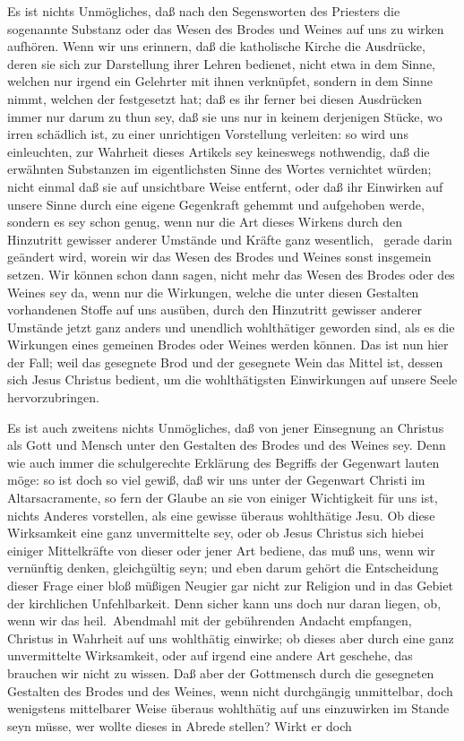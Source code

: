 \begin{aufzb}
\item Es ist nichts Unmögliches, daß nach den Segensworten des Priesters die sogenannte Substanz oder das Wesen des Brodes und Weines auf uns zu wirken aufhören. Wenn wir uns erinnern, daß die katholische Kirche die Ausdrücke, deren sie sich zur Darstellung ihrer Lehren bedienet, nicht etwa in dem Sinne, welchen nur irgend ein Gelehrter mit ihnen verknüpfet, sondern in dem Sinne nimmt, welchen der  festgesetzt hat; daß es ihr ferner bei diesen Ausdrücken immer nur darum zu thun sey, daß sie uns nur in keinem derjenigen Stücke, wo irren schädlich ist, zu einer unrichtigen Vorstellung verleiten: so wird uns einleuchten, zur Wahrheit dieses Artikels sey keineswegs nothwendig, daß die erwähnten Substanzen im eigentlichsten Sinne des Wortes vernichtet würden; nicht einmal daß sie auf unsichtbare Weise entfernt, oder daß ihr Einwirken auf unsere Sinne durch eine eigene Gegenkraft gehemmt und aufgehoben werde, sondern es sey schon genug, wenn nur die Art dieses Wirkens durch den Hinzutritt gewisser anderer Umstände und Kräfte ganz wesentlich, \dh\  gerade darin geändert wird, worein wir das Wesen des Brodes und Weines sonst insgemein setzen. Wir können schon dann sagen, nicht mehr das Wesen des Brodes oder des Weines sey da, wenn nur die Wirkungen, welche die unter diesen Gestalten vorhandenen Stoffe auf uns ausüben, durch den Hinzutritt gewisser anderer Umstände jetzt ganz anders und unendlich wohlthätiger geworden sind, als es die Wirkungen eines gemeinen Brodes oder Weines werden können. Das ist nun hier der Fall; weil das gesegnete Brod und der gesegnete Wein das Mittel ist, dessen sich Jesus Christus bedient, um die wohlthätigsten Einwirkungen auf unsere Seele hervorzubringen.
\item Es ist auch zweitens nichts Unmögliches, daß von jener Einsegnung an Christus als Gott und Mensch unter den Gestalten des Brodes und des Weines  sey. Denn wie auch immer die schulgerechte Erklärung des Begriffs der Gegenwart lauten möge: so ist doch so viel gewiß, daß wir uns unter der Gegenwart Christi im Altarsacramente, so fern der Glaube an sie von einiger Wichtigkeit für uns ist, nichts Anderes vorstellen, als eine gewisse überaus wohlthätige  Jesu. Ob diese Wirksamkeit eine ganz unvermittelte sey, oder ob Jesus Christus sich hiebei einiger Mittelkräfte von dieser oder jener Art bediene, das muß uns, wenn wir vernünftig denken, gleichgültig seyn; und eben darum gehört die Entscheidung dieser Frage einer bloß müßigen Neugier gar nicht zur Religion und in das Gebiet der kirchlichen Unfehlbarkeit. Denn sicher kann uns doch nur daran liegen, ob, wenn wir das heil.\ Abendmahl mit der gebührenden Andacht empfangen, Christus in Wahrheit auf uns wohlthätig einwirke; ob dieses aber durch eine ganz unvermittelte Wirksamkeit, oder auf irgend eine andere Art geschehe, das brauchen wir nicht zu wissen. Daß aber der Gottmensch durch die gesegneten Gestalten des Brodes und des Weines, wenn nicht durchgängig unmittelbar, doch wenigstens mittelbarer Weise überaus wohlthätig auf uns einzuwirken im Stande seyn müsse, wer wollte dieses in Abrede stellen? Wirkt er doch

\end{aufzb}
